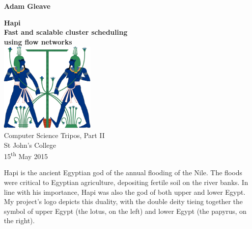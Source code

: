 \documentclass[12pt,a4paper,twoside,notitlepage]{report}
\theoremstyle{plain}
\theoremstyle{definition}
\theoremstyle{remark}
\begin{document}

\nocite{*}                      %

\pagestyle{empty}

\hfill{\large \bf Adam Gleave}

\vspace*{30mm}


\begin{center}
    {\fontsize{36pt}{1em}\selectfont \textbf{Hapi}} \\
    \large
    \vspace*{2mm}
    \textbf{Fast and scalable cluster scheduling \\ using flow networks} \\
   	\vspace*{10mm}
    \includegraphics[width=0.35\textwidth]{logo/Hapy_tying} \\
	\vspace*{10mm}
	Computer Science Tripos, Part II \\
	\vspace*{5mm}
	St John's College \\
	\vspace*{5mm}
    15\textsuperscript{th} May 2015
\end{center}
\clearpage
\vspace*{\fill}

Hapi is the ancient Egyptian god of the annual flooding of the Nile. The floods were critical to Egyptian agriculture, depositing fertile soil on the river banks. In line with his importance, Hapi was also the god of both upper and lower Egypt. My project's logo depicts this duality, with the double deity tieing together the symbol of upper Egypt (the lotus, on the left) and lower Egypt (the papyrus, on the right).
\end{document}
